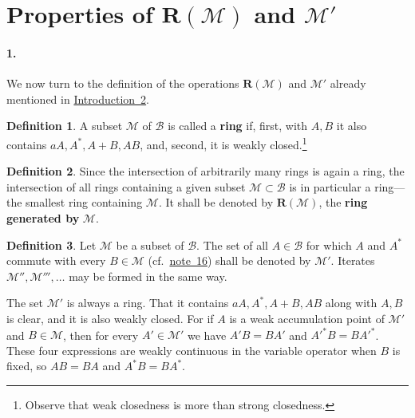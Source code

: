 \documentclass[
  paper=b5,
  twoside=true,
  fontsize=13pt,
  headings=normal,
  bookmarkpackage=false
]{scrartcl}
\theoremstyle{definition}
\newtheorem{definition}{Definition}
\newcommand{\NoteRef}[1]{\hyperref[fn:#1]{note~#1}}
\newcommand{\GeneratedRing}{\boldsymbol{R}}
\begin{document}
\section{Properties of
  \texorpdfstring{\(\GeneratedRing (\mathcal M)\) and \(\mathcal M'\)}
  {R(M) and M'}}\label{sec:ring-and-commutant}

\paragraph*{1.}\label{sec:ring-and-commutant-1}
We now turn to the definition of the operations \(\GeneratedRing (\mathcal M)\) and
\(\mathcal M'\) already mentioned in
\hyperref[intro:2]{Introduction~2}.

\begin{definition}\label{def:1}
A subset \(\mathcal M\) of \(\mathcal B\) is called a \textbf{ring} if,
first, with \(A,B\) it also contains \(aA,A^*,A+B,AB\), and, second, it is
weakly closed.\footnote{\label{fn:40}Observe that
weak closedness is more than strong closedness.}
\end{definition}

\begin{definition}\label{def:2}
Since the intersection of arbitrarily many rings is again a ring, the
intersection of all rings containing a given subset
\(\mathcal M\subset\mathcal B\) is in particular a ring---the smallest
ring containing \(\mathcal M\).  It shall be denoted by
\(\GeneratedRing (\mathcal M)\), the \textbf{ring generated by} \(\mathcal M\).
\end{definition}

\begin{definition}\label{def:3}
Let \(\mathcal M\) be a subset of \(\mathcal B\).  The set of all
\(A\in\mathcal B\) for which \(A\) and \(A^*\) commute with every
\(B\in\mathcal M\) (cf.\ \NoteRef{16}) shall be denoted by
\(\mathcal M'\).  Iterates
\(\mathcal M'',\mathcal M''',\ldots\) may be formed in the same way.
\end{definition}

The set \(\mathcal M'\) is always a ring. That it contains
\(aA,A^*,A+B,AB\) along with \(A,B\) is clear, and it is also weakly
closed. For if \(A\) is a weak accumulation point of \(\mathcal M'\)
and \(B\in\mathcal M\), then for every \(A'\in\mathcal M'\) we have
\(A'B=BA'\) and \(A'^*B=BA'^*\). These four expressions are weakly
continuous in the variable operator when \(B\) is fixed, so
\(AB=BA\) and \(A^*B=BA^*\).
\end{document}
